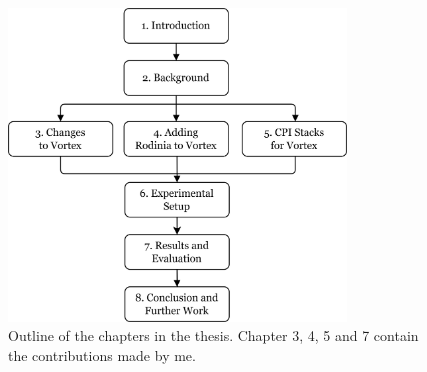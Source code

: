 \begin{figure}
    \centering
    \includegraphics[width=0.8\textwidth]{figures/thesis-outline.png}
    \caption[Thesis outline]{Outline of the chapters in the thesis. Chapter 3, 4, 5 and 7 contain the contributions made by me.}
    \label{fig:thesis_outline}
\end{figure}
